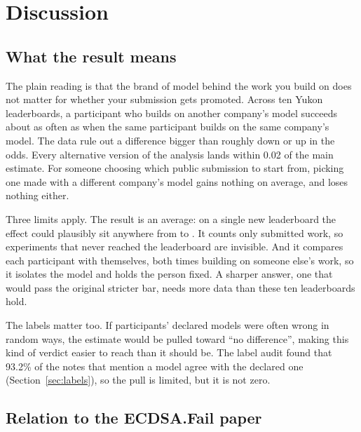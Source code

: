 \section{Discussion}
\label{sec:discussion}

\subsection{What the result means}

The plain reading is that the brand of model behind the work you build on does not matter for whether your submission gets promoted.
Across ten Yukon leaderboards, a participant who builds on another company's model succeeds about as often as when the same participant builds on the same company's model.
The data rule out a difference bigger than roughly \PlainLowPct{} down or \PlainHighPct{} up in the odds.
Every alternative version of the analysis lands within 0.02 of the main estimate.
For someone choosing which public submission to start from, picking one made with a different company's model gains nothing on average, and loses nothing either.

Three limits apply.
The result is an average: on a single new leaderboard the effect could plausibly sit anywhere from \PredLow{} to \PredHigh{}.
It counts only submitted work, so experiments that never reached the leaderboard are invisible.
And it compares each participant with themselves, both times building on someone else's work, so it isolates the model and holds the person fixed.
A sharper answer, one that would pass the original stricter bar, needs more data than these ten leaderboards hold.

The labels matter too.
If participants' declared models were often wrong in random ways, the estimate would be pulled toward ``no difference'', making this kind of verdict easier to reach than it should be.
The label audit found that 93.2\% of the notes that mention a model agree with the declared one (Section~\ref{sec:labels}), so the pull is limited, but it is not zero.

\subsection{Relation to the ECDSA.Fail paper}


